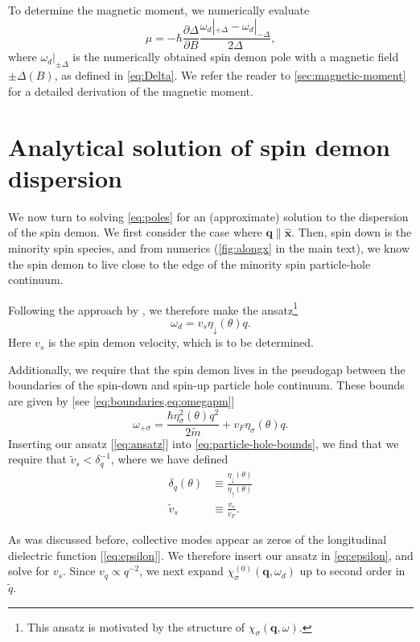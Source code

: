 \documentclass[aps,prb,reprint,twocolumns,superscriptaddress,nofootinbib]{revtex4-2}
\newcommand{\xx}{\hat{\bm{x}}}
\newcommand{\mdos}{\tilde{m}}
\begin{document}
	To determine the magnetic moment, we numerically evaluate
	\begin{equation}
		\mu = -\hbar\frac{\partial\Delta}{\partial B} \frac{\omega_d|_{+\Delta}-\omega_d|_{-\Delta}}{2\Delta},
	\end{equation}
	where $\omega_d|_{\pm\Delta}$ is the numerically obtained spin demon pole with a magnetic field $\pm\Delta(B)$, as defined in \cref{eq:Delta}. We refer the reader to  \cref{sec:magnetic-moment} for a detailed derivation of the magnetic moment.
	
	
	\section{Analytical solution of spin demon dispersion}
	We now turn to solving \cref{eq:poles} for an (approximate) solution to the dispersion of the spin demon.  
	We first consider the case where $\bm q\parallel \xx$. Then, spin down is the minority spin species, and from numerics (\cref{fig:alongx} in the main text), we know the spin demon to live close to the edge of the minority spin particle-hole continuum.
	
	Following the approach by \textcite{santoroAcousticPlasmonsConducting1988}, we therefore make the ansatz\footnote{This ansatz is motivated by the structure of $\chi_\sigma(\bm q,\omega)$.}  
	\begin{equation}
		\omega_d = v_s \eta_{\downarrow}(\theta)q. \label{eq:ansatz}
	\end{equation}
	Here $v_s$ is the spin demon velocity, which is to be determined.
	
	
	Additionally, we require that the spin demon lives in the pseudogap between the boundaries of the spin-down and spin-up particle hole continuum. These bounds are given by [see \cref{eq:boundaries,eq:omegapm}]
	\begin{equation}
		\omega_{+\sigma} = \frac{\hbar\eta_\sigma^2(\theta) q^2}{2\mdos} + v_F  \eta_\sigma(\theta) q. \label{eq:particle-hole-bounds}
	\end{equation}
	Inserting our ansatz [\cref{eq:ansatz}] into \cref{eq:particle-hole-bounds}, we find that we require that $\tilde v_s < \delta_q^{-1}$, where we have defined
	\begin{align}
		\delta_q(\theta)&\equiv \frac{\eta_\downarrow(\theta)}{\eta_\uparrow(\theta)} \\
		\tilde v_s&\equiv  \frac{v_s}{v_F}.
	\end{align}
	
	As was discussed before, collective modes appear as zeros of the longitudinal dielectric function [\cref{eq:epsilon}]. We therefore insert our ansatz in \cref{eq:epsilon}, and solve for $v_s$. Since $v_q\propto q^{-2}$, we next expand  $\chi_\sigma^{(0)}(\bm q,\omega_d)$ up to second order in $\tilde q$.
	
\end{document}
